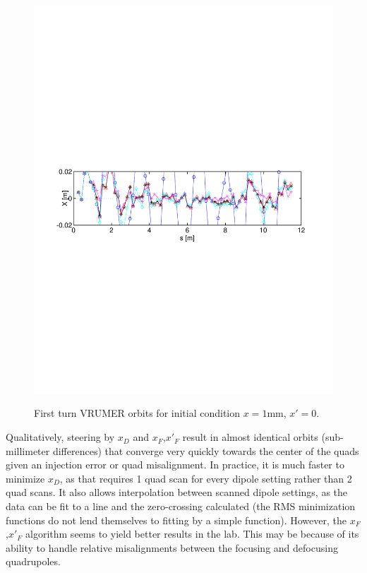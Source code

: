 \begin{figure}[!htb]
{	\includegraphics[width=\textwidth,trim={.5in 4.3in .7in 4.5in},clip]{4.figures/vrumer_steering_algorithm_compare_x1_xp0_sig5.pdf}}
\caption{First turn VRUMER orbits for initial condition $x=1$mm, $x'=0$. 
}
\label{fig:algorithm}
\end{figure}




Qualitatively, steering by $x_D$ and $x_F$,$x'_F$ result in almost identical orbits (sub-millimeter differences) that converge very quickly towards the center of the quads given an injection error or quad misalignment.
 In practice, it is much faster to minimize $x_D$, as that requires 1 quad scan for every dipole setting rather than 2 quad scans. It also allows interpolation between scanned dipole settings, as the data can be fit to a line and the zero-crossing calculated (the RMS minimization functions do not lend themselves to fitting by a simple function). However, the $x_F$,$x'_F$ algorithm seems to yield better results in the lab. 
This may be because of its ability to handle relative misalignments between the focusing and defocusing quadrupoles.

